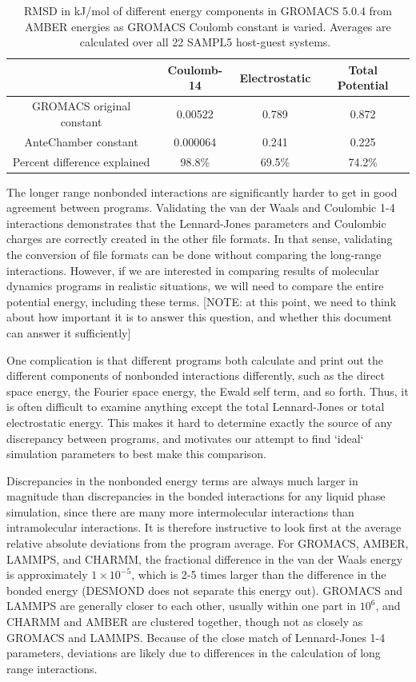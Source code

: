 \begin{table}
\caption{RMSD in kJ/mol of different energy components in GROMACS
  5.0.4 from AMBER energies as GROMACS Coulomb constant is
  varied. Averages are calculated over all 22 SAMPL5 host-guest
  systems.~\label{table:coulchange}}
\begin{tabular}{|c|ccc|}
\hline
                          & Coulomb-14  & Electrostatic & Total Potential \\
\hline
GROMACS original constant &  0.00522    & 0.789         & 0.872  \\ 
AnteChamber constant      &  0.000064   & 0.241         & 0.225 \\
Percent difference explained & 98.8\%   & 69.5\%        & 74.2\% \\  
\hline
\end{tabular}
\end{table}

The longer range nonbonded interactions are significantly harder to
get in good agreement between programs.  Validating the van der Waals
and Coulombic 1-4 interactions demonstrates that the Lennard-Jones
parameters and Coulombic charges are correctly created in the other
file formats.  In that sense, validating the conversion of file
formats can be done without comparing the long-range
interactions. However, if we are interested in comparing results of
molecular dynamics programs in realistic situations, we will need to
compare the entire potential energy, including these terms. [NOTE: at
  this point, we need to think about how important it is to answer
  this question, and whether this document can answer it sufficiently]

One complication is that different programs both calculate and print
out the different components of nonbonded interactions differently,
such as the direct space energy, the Fourier space energy, the Ewald
self term, and so forth.  Thus, it is often difficult to examine
anything except the total Lennard-Jones or total electrostatic
energy. This makes it hard to determine exactly the source of any
discrepancy between programs, and motivates our attempt to find
`ideal` simulation parameters to best make this comparison.

Discrepancies in the nonbonded energy terms are always much larger in
magnitude than discrepancies in the bonded interactions for any liquid
phase simulation, since there are many more intermolecular
interactions than intramolecular interactions.  It is therefore
instructive to look first at the average relative absolute deviations
from the program average. For GROMACS, AMBER, LAMMPS, and CHARMM, the
fractional difference in the van der Waals energy is approximately
$1\times 10^{-5}$, which is 2-5 times larger than the difference in
the bonded energy (DESMOND does not separate this energy out). GROMACS
and LAMMPS are generally closer to each other, usually within one part
in $10^6$, and CHARMM and AMBER are clustered together, though not as
closely as GROMACS and LAMMPS. Because of the close match of
Lennard-Jones 1-4 parameters, deviations are likely due to differences
in the calculation of long range interactions.

